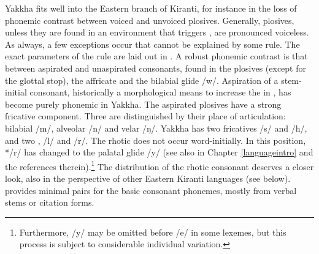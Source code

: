 Yakkha fits well into the Eastern branch of Kiranti, for instance in the loss of phonemic  contrast between voiced and unvoiced plosives. Generally, plosives, unless they are found in an environment that triggers , are pronounced voiceless. As always, a few exceptions occur that cannot be explained by some rule. The exact parameters of the  rule are laid out in  . A robust phonemic contrast is that between aspirated and unaspirated consonants, found in the plosives (except for the glottal stop), the affricate and the bilabial glide /w/. Aspiration of a stem-initial consonant, historically a morphological means to increase the  in  \citep{Michailovsky1994Manner, Jacques2012_Internal, Hill2014_Note}, has become purely phonemic in Yakkha.  The aspirated plosives have a strong fricative component. Three  are distinguished by their place of articulation: bilabial  /m/, alveolar /n/ and velar /ŋ/. Yakkha has two fricatives /s/ and /h/, and two , /l/ and /r/. The rhotic does not occur word-initially. In this position, */r/ has changed to the palatal glide /y/ (see also   in Chapter \ref{languageintro} and the references therein).\footnote{Furthermore, /y/ may be omitted before /e/ in some lexemes, but this process is subject to considerable individual variation.}  The distribution of the rhotic consonant deserves a closer look, also in the perspective of other Eastern Kiranti languages (see  below).  provides minimal pairs for the basic consonant phonemes, mostly from verbal stems or citation forms.


